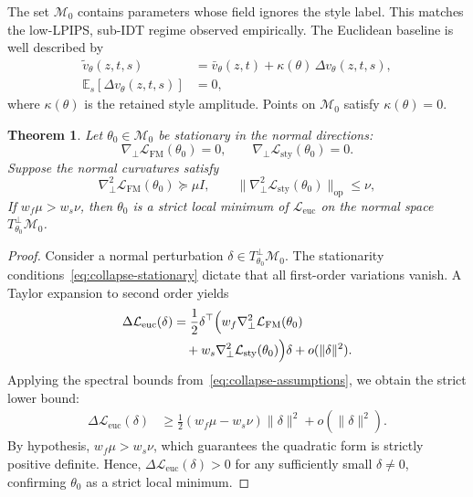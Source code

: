 \documentclass[letterpaper]{article}
\newtheorem{theorem}{Theorem}
\begin{document}
The set $\mathcal M_0$ contains parameters whose field ignores the style label.
This matches the low-LPIPS, sub-IDT regime observed empirically.
The Euclidean baseline is well described by
\begin{equation}
\begin{aligned}
\tilde v_\theta(z,t,s)
&=
\bar v_\theta(z,t) + \kappa(\theta)\,\Delta v_\theta(z,t,s),\\
\mathbb E_s[\Delta v_\theta(z,t,s)]
&= 0,
\end{aligned}
\label{eq:kappa}
\end{equation}
where $\kappa(\theta)$ is the retained style amplitude. Points on $\mathcal M_0$ satisfy $\kappa(\theta)=0$.

\begin{theorem}
\label{thm:attractor}
Let $\theta_0\in\mathcal M_0$ be stationary in the normal directions:
\begin{equation}
\nabla_\perp \mathcal L_{\mathrm{FM}}(\theta_0)=0,
\qquad
\nabla_\perp \mathcal L_{\mathrm{sty}}(\theta_0)=0.
\label{eq:collapse-stationary}
\end{equation}
Suppose the normal curvatures satisfy
\begin{equation}
\nabla_\perp^2 \mathcal L_{\mathrm{FM}}(\theta_0)\succeq \mu I,
\qquad
\|\nabla_\perp^2 \mathcal L_{\mathrm{sty}}(\theta_0)\|_{\mathrm{op}}\le\nu,
\label{eq:collapse-assumptions}
\end{equation}
If $w_f\mu>w_s\nu$, then $\theta_0$ is a strict local minimum of $\mathcal L_{\mathrm{euc}}$ on the normal space $T_{\theta_0}^{\perp}\mathcal M_0$.
\end{theorem}
\begin{proof}
Consider a normal perturbation $\delta\in T_{\theta_0}^{\perp}\mathcal M_0$. The stationarity conditions~\eqref{eq:collapse-stationary} dictate that all first-order variations vanish. A Taylor expansion to second order yields
\begin{align}
\Delta \mathcal L_{\mathrm{euc}}(\delta)
&=
\frac{1}{2} \delta^\top
\Bigl(
w_f\nabla_\perp^2 \mathcal L_{\mathrm{FM}}(\theta_0) \notag\\
&\quad +
w_s\nabla_\perp^2 \mathcal L_{\mathrm{sty}}(\theta_0)
\Bigr)\delta + o(\|\delta\|^2).
\end{align}
Applying the spectral bounds from~\eqref{eq:collapse-assumptions}, we obtain the strict lower bound:
\begin{align}
\Delta \mathcal L_{\mathrm{euc}}(\delta)
&\ge
\frac{1}{2}(w_f\mu-w_s\nu)\|\delta\|^2 + o(\|\delta\|^2).
\end{align}
By hypothesis, $w_f\mu > w_s\nu$, which guarantees the quadratic form is strictly positive definite. Hence, $\Delta \mathcal L_{\mathrm{euc}}(\delta) > 0$ for any sufficiently small $\delta \neq 0$, confirming $\theta_0$ as a strict local minimum.
\end{proof}
\end{document}
